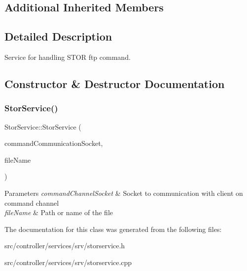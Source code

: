 \subsection*{Additional Inherited Members}


\subsection{Detailed Description}
Service for handling S\+T\+OR ftp command. 

\subsection{Constructor \& Destructor Documentation}
\mbox{\label{classStorService_a19cc8069d319617d264edadfbf20f37b}} 
\subsubsection{\texorpdfstring{Stor\+Service()}{StorService()}}
{\footnotesize\ttfamily Stor\+Service\+::\+Stor\+Service (\begin{DoxyParamCaption}\item[{int}]{command\+Communication\+Socket,  }\item[{const Q\+String \&}]{file\+Name }\end{DoxyParamCaption})}


\begin{DoxyParams}{Parameters}
{\em command\+Channel\+Socket} & Socket to communication with client on command channel \\
\hline
{\em file\+Name} & Path or name of the file \\
\hline
\end{DoxyParams}


The documentation for this class was generated from the following files\+:\begin{DoxyCompactItemize}
\item 
src/controller/services/srv/storservice.\+h\item 
src/controller/services/srv/storservice.\+cpp\end{DoxyCompactItemize}
